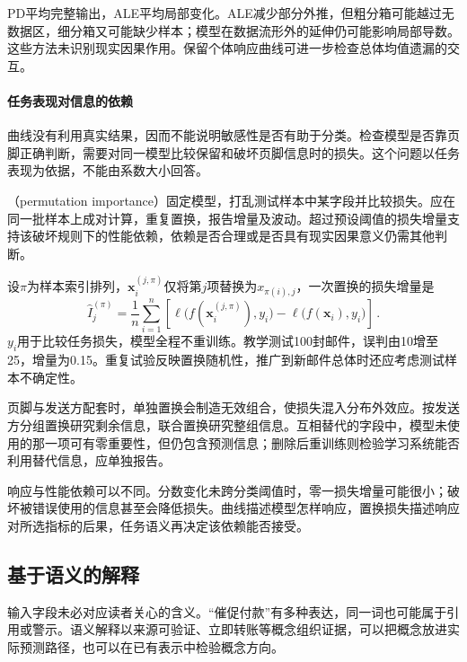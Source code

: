 PD平均完整输出，ALE平均局部变化。ALE减少部分外推，但粗分箱可能越过无数据区，细分箱又可能缺少样本；模型在数据流形外的延伸仍可能影响局部导数。这些方法未识别现实因果作用。保留个体响应曲线可进一步检查总体均值遗漏的交互。

\paragraph{任务表现对信息的依赖}

曲线没有利用真实结果，因而不能说明敏感性是否有助于分类。检查模型是否靠页脚正确判断，需要对同一模型比较保留和破坏页脚信息时的损失。这个问题以任务表现为依据，不能由系数大小回答。

（permutation importance）固定模型，打乱测试样本中某字段并比较损失。应在同一批样本上成对计算，重复置换，报告增量及波动。超过预设阈值的损失增量支持该破坏规则下的性能依赖，依赖是否合理或是否具有现实因果意义仍需其他判断。

设$\pi$为样本索引排列，$\bm x_i^{(j,\pi)}$仅将第$j$项替换为$x_{\pi(i),j}$，一次置换的损失增量是
\begin{equation}
 \widehat I_j^{(\pi)}
 =\frac1n\sum_{i=1}^n\left[
 \ell\bigl(f(\bm{x}_i^{(j,\pi)}),y_i\bigr)
 -\ell\bigl(f(\bm{x}_i),y_i\bigr)\right]\, .
 \label{eq:interpretability-permutation}
\end{equation}
$y_i$用于比较任务损失，模型全程不重训练。教学测试100封邮件，误判由10增至25，增量为0.15。重复试验反映置换随机性，推广到新邮件总体时还应考虑测试样本不确定性。

页脚与发送方配套时，单独置换会制造无效组合，使损失混入分布外效应。按发送方分组置换研究剩余信息，联合置换研究整组信息。互相替代的字段中，模型未使用的那一项可有零重要性，但仍包含预测信息；删除后重训练则检验学习系统能否利用替代信息，应单独报告。

响应与性能依赖可以不同。分数变化未跨分类阈值时，零一损失增量可能很小；破坏被错误使用的信息甚至会降低损失。曲线描述模型怎样响应，置换损失描述响应对所选指标的后果，任务语义再决定该依赖能否接受。

\subsection{基于语义的解释}
\label{sec:interpretability-global-concepts}

输入字段未必对应读者关心的含义。“催促付款”有多种表达，同一词也可能属于引用或警示。语义解释以来源可验证、立即转账等概念组织证据，可以把概念放进实际预测路径，也可以在已有表示中检验概念方向。

